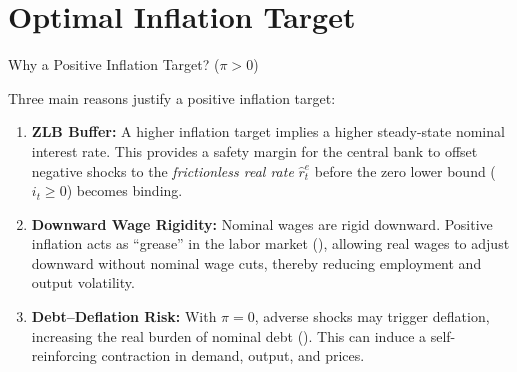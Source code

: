 \documentclass[11pt,aspectratio=169]{beamer}
\begin{document}
\section{Optimal Inflation Target\label{Chapter7-IT}}
\begin{frame}{Why a Positive Inflation Target? ($\pi > 0$)}
\small

Three main reasons justify a positive inflation target:

\vspace{0.4cm}

\begin{enumerate}
    \item \textbf{ZLB Buffer:} A higher inflation target implies a higher steady-state nominal interest rate.
    This provides a safety margin for the central bank to offset negative shocks to the \emph{frictionless real rate} $\hat{r}_t^{e}$ before the zero lower bound ($i_t \ge 0$) becomes binding.
    
    \vspace{0.2cm}
    
    \item \textbf{Downward Wage Rigidity:} Nominal wages are rigid downward.
    Positive inflation acts as “grease” in the labor market (\cite{tobin1972}), allowing real wages to adjust downward without nominal wage cuts, thereby reducing employment and output volatility.
    
    \vspace{0.2cm}
    
    \item \textbf{Debt–Deflation Risk:} With $\pi = 0$, adverse shocks may trigger deflation, increasing the real burden of nominal debt (\cite{fisher1933}).
    This can induce a self-reinforcing contraction in demand, output, and prices.
\end{enumerate}

\end{frame}
\end{document}
